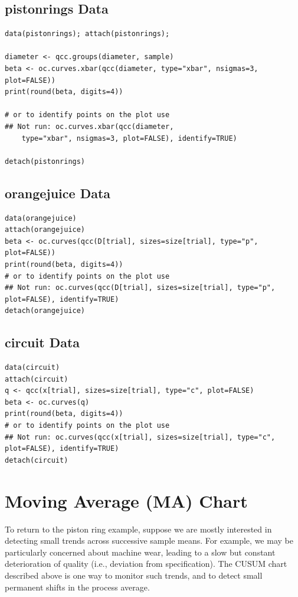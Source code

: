 \documentclass[a4paper,12pt]{article}
\begin{document}
\newpage
\subsection{pistonrings Data}
\begin{framed}
\begin{verbatim}
data(pistonrings); attach(pistonrings);

diameter <- qcc.groups(diameter, sample)
beta <- oc.curves.xbar(qcc(diameter, type="xbar", nsigmas=3, plot=FALSE))
print(round(beta, digits=4))

# or to identify points on the plot use
## Not run: oc.curves.xbar(qcc(diameter, 
    type="xbar", nsigmas=3, plot=FALSE), identify=TRUE)

detach(pistonrings)
\end{verbatim}
\end{framed}


\newpage
\subsection{orangejuice Data}
\begin{framed}
\begin{verbatim}
data(orangejuice)
attach(orangejuice)
beta <- oc.curves(qcc(D[trial], sizes=size[trial], type="p", plot=FALSE))
print(round(beta, digits=4))
# or to identify points on the plot use
## Not run: oc.curves(qcc(D[trial], sizes=size[trial], type="p", plot=FALSE), identify=TRUE)
detach(orangejuice)
\end{verbatim}
\end{framed}
\newpage
\subsection{circuit Data}
\begin{framed}
\begin{verbatim}
data(circuit)
attach(circuit)
q <- qcc(x[trial], sizes=size[trial], type="c", plot=FALSE)
beta <- oc.curves(q)
print(round(beta, digits=4))
# or to identify points on the plot use
## Not run: oc.curves(qcc(x[trial], sizes=size[trial], type="c", plot=FALSE), identify=TRUE)
detach(circuit)
\end{verbatim}
\end{framed}
\newpage
\section{Moving Average (MA) Chart}
To return to the piston ring example, suppose we are mostly interested in detecting small trends across successive sample means. For example, we may be particularly concerned about machine wear, leading to a slow but constant deterioration of quality (i.e., deviation from specification). The CUSUM chart described above is one way to monitor such trends, and to detect small permanent shifts in the process average. 
\end{document}
